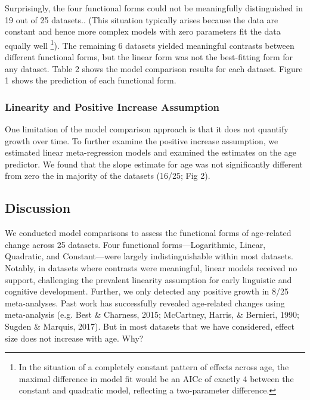 \documentclass[
  man]{apa6}
\begin{document}
Surprisingly, the four functional forms could not be meaningfully distinguished in 19 out of 25 datasets.. (This situation typically arises because the data are constant and hence more complex models with zero parameters fit the data equally well \footnote{In the situation of a completely constant pattern of effects across age, the maximal difference in model fit would be an AICc of exactly 4 between the constant and quadratic model, reflecting a two-parameter difference.}). The remaining 6 datasets yielded meaningful contrasts between different functional forms, but the linear form was not the best-fitting form for any dataset. Table 2 shows the model comparison results for each dataset. Figure 1 shows the prediction of each functional form.

\hypertarget{linearity-and-positive-increase-assumption}{%
\subsubsection{Linearity and Positive Increase Assumption}\label{linearity-and-positive-increase-assumption}}

One limitation of the model comparison approach is that it does not quantify growth over time. To further examine the positive increase assumption, we estimated linear meta-regression models and examined the estimates on the age predictor. We found that the slope estimate for age was not significantly different from zero the in majority of the datasets (16/25; Fig 2).

\hypertarget{discussion}{%
\subsection{Discussion}\label{discussion}}

We conducted model comparisons to assess the functional forms of age-related change across 25 datasets. Four functional forms---Logarithmic, Linear, Quadratic, and Constant---were largely indistinguishable within most datasets. Notably, in datasets where contrasts were meaningful, linear models received no support, challenging the prevalent linearity assumption for early linguistic and cognitive development. Further, we only detected any positive growth in 8/25 meta-analyses. Past work has successfully revealed age-related changes using meta-analysis (e.g. Best \& Charness, 2015; McCartney, Harris, \& Bernieri, 1990; Sugden \& Marquis, 2017). But in most datasets that we have considered, effect size does not increase with age. Why?
\end{document}
